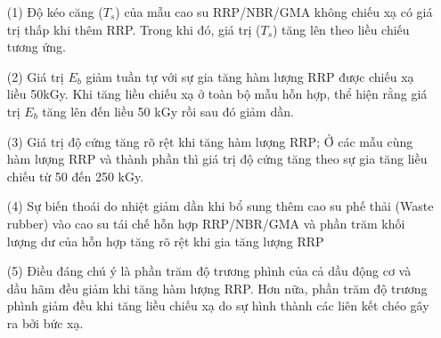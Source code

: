 \documentclass[12pt,a4paper]{article}
\begin{document}
	\begin{enumerate}
	\item[(1)] Độ kéo căng ($T_s$) của mẫu cao su RRP/NBR/GMA không chiếu xạ có giá trị thấp khi thêm RRP. Trong khi đó, giá trị ($T_s$) tăng lên theo liều chiếu tương ứng.
	\item[(2)] Giá trị $E_b$ giảm tuần tự với sự gia tăng hàm lượng RRP được chiếu xạ liều 50kGy. Khi tăng liều chiếu xạ ở toàn bộ mẫu hỗn hợp, thể hiện rằng giá trị $E_b$ tăng lên đến liều 50 kGy rồi sau đó giảm dần.
	\item[(3)] Giá trị độ cứng tăng rõ rệt khi tăng hàm lượng RRP; Ở các mẫu cùng hàm lượng RRP và thành phần thì giá trị độ cứng tăng theo sự gia tăng liều chiếu từ 50 đến 250 kGy.
	\item[(4)] Sự biến thoái do nhiệt giảm dần khi bổ sung thêm cao su phế thải (Waste rubber) vào cao su tái chế hỗn hợp RRP/NBR/GMA và phần trăm khối lượng dư của hỗn hợp tăng rõ rệt khi gia tăng lượng RRP
	\item[(5)] Điều đáng chú ý là phần trăm độ trương phình của cả dầu động cơ và dầu hãm đều giảm khi tăng hàm lượng RRP. Hơn nữa, phần trăm độ trương phình giảm đều khi tăng liều chiếu xạ do sự hình thành các liên kết chéo gây ra bởi bức xạ.
	
	\end{enumerate}
	
	
	
	
	
\end{document}
